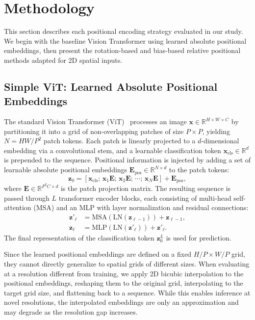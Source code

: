 \section{Methodology}
\label{sec:methodology}

This section describes each positional encoding strategy evaluated in our study. We begin with the baseline Vision Transformer using learned absolute positional embeddings, then present the rotation-based and bias-based relative positional methods adapted for 2D spatial inputs.

\subsection{Simple ViT: Learned Absolute Positional Embeddings}

The standard Vision Transformer (ViT)~\cite{dosovitskiy2021image,beyer2022better} processes an image $\mathbf{x} \in \mathbb{R}^{H \times W \times C}$ by partitioning it into a grid of non-overlapping patches of size $P \times P$, yielding $N = HW/P^2$ patch tokens. Each patch is linearly projected to a $d$-dimensional embedding via a convolutional stem, and a learnable classification token $\mathbf{x}_{\text{cls}} \in \mathbb{R}^d$ is prepended to the sequence. Positional information is injected by adding a set of learnable absolute positional embeddings $\mathbf{E}_{\text{pos}} \in \mathbb{R}^{N \times d}$ to the patch tokens:
\begin{equation}
\mathbf{z}_0 = [\mathbf{x}_{\text{cls}};\, \mathbf{x}_1 \mathbf{E};\, \mathbf{x}_2 \mathbf{E};\, \cdots;\, \mathbf{x}_N \mathbf{E}] + \mathbf{E}_{\text{pos}},
\end{equation}
where $\mathbf{E} \in \mathbb{R}^{P^2 C \times d}$ is the patch projection matrix. The resulting sequence is passed through $L$ transformer encoder blocks, each consisting of multi-head self-attention (MSA) and an MLP with layer normalization and residual connections:
\begin{align}
\mathbf{z}'_\ell &= \text{MSA}(\text{LN}(\mathbf{z}_{\ell-1})) + \mathbf{z}_{\ell-1}, \\
\mathbf{z}_\ell &= \text{MLP}(\text{LN}(\mathbf{z}'_\ell)) + \mathbf{z}'_\ell.
\end{align}
The final representation of the classification token $\mathbf{z}_0^L$ is used for prediction.

Since the learned positional embeddings are defined on a fixed $H/P \times W/P$ grid, they cannot directly generalize to spatial grids of different sizes. When evaluating at a resolution different from training, we apply 2D bicubic interpolation to the positional embeddings, reshaping them to the original grid, interpolating to the target grid size, and flattening back to a sequence. While this enables inference at novel resolutions, the interpolated embeddings are only an approximation and may degrade as the resolution gap increases.



